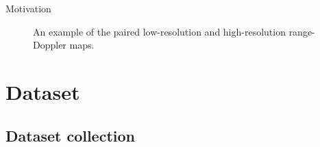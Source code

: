 \documentclass{beamer}
\newcounter{section}
\begin{document}
\begin{frame}[t]{Motivation}
{\begin{figure}
\begin{minipage}{0.45\textwidth}
        \end{minipage}
        \caption{An example of the paired low-resolution and high-resolution range-Doppler maps.}
    \end{figure}
    }

\end{frame}


\begin{frame}
	\tableofcontents
\end{frame}





\section{Dataset}
\subsection{Dataset collection}
\setcounter{section}{1}
\setcounter{figure}{0}
\end{document}
